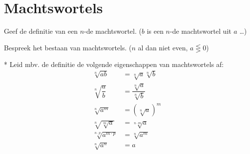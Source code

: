 \documentclass[12pt,twoside]{article}
\begin{document}
\pagebreak
\section{Machtswortels}

\begin{oefening}
Geef de definitie van een $n$-de machtswortel. ($b$ is een $n$-de machtswortel uit $a$ \ldots)
\end{oefening}

\begin{oefening}
Bespreek het bestaan van machtswortels. ($n$ al dan niet even, $a \lesseqgtr 0$)
\end{oefening}

\begin{oefening}*
Leid mbv. de definitie de volgende eigenschappen van machtswortels af:
\begin{align*}
  \sqrt[n]{ab} &= \sqrt[n]{a}\sqrt[n]{b}\\
  \sqrt[n]{\dfrac{a}{b}} &= \dfrac{\sqrt[n]{a}}{\sqrt[n]{b}}\\
  \sqrt[n]{a^m} &= \left(\sqrt[n]{a}\right)^m\\
  \sqrt[n]{\sqrt[m]{a}} &= \sqrt[n\cdot m]{a}\\
  \sqrt[n\cdot p]{a^{m\cdot p}} &= \sqrt[n]{a^m}\\
  \sqrt[n]{a^n} &= a
\end{align*}
\end{oefening}
\end{document}
